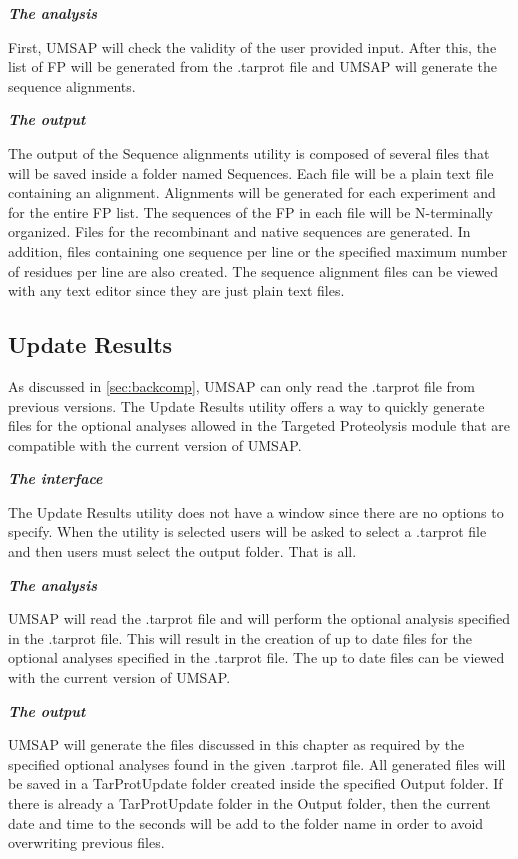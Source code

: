 \textit{\textbf{The analysis}}

First, UMSAP will check the validity of the user provided input. After this, the list of FP will be generated from the .tarprot file and UMSAP will generate the sequence alignments.

\textit{\textbf{The output}}

The output of the Sequence alignments utility is composed of several files that will be saved inside a folder named Sequences. Each file will be a plain text file containing an alignment. Alignments will be generated for each experiment and for the entire FP list. The sequences of the FP in each file will be N-terminally organized. Files for the recombinant and native sequences are generated. In addition, files containing one sequence per line or the specified maximum number of residues per line are also created. The sequence alignment files can be viewed with any text editor since they are just plain text files.

\subsection{Update Results}
\label{subsec:updateres}

As discussed in \autoref{sec:backcomp}, UMSAP can only read the .tarprot file from previous versions. The Update Results utility offers a way to quickly generate files for the optional analyses allowed in the Targeted Proteolysis module that are compatible with the current version of UMSAP.

\textit{\textbf{The interface}}

The Update Results utility does not have a window since there are no options to specify. When the utility is selected users will be asked to select a .tarprot file and then users must select the output folder. That is all.

\textit{\textbf{The analysis}}

UMSAP will read the .tarprot file and will perform the optional analysis specified in the .tarprot file. This will result in the creation of up to date files for the optional analyses specified in the .tarprot file. The up to date files can be viewed with the current version of UMSAP.

\textit{\textbf{The output}}

UMSAP will generate the files discussed in this chapter as required by the specified optional analyses found in the given .tarprot file. All generated files will be saved in a TarProtUpdate folder created inside the specified Output folder. If there is already a TarProtUpdate folder in the Output folder, then the current date and time to the seconds will be add to the folder name in order to avoid overwriting previous files. 

